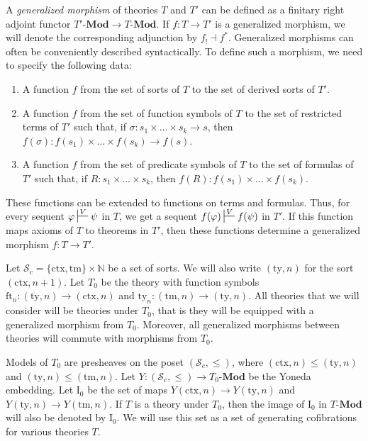 \documentclass[reqno]{amsart}
\theoremstyle{definition}
\theoremstyle{remark}
\newcommand{\fs}[1]{\mathrm{#1}}
\newcommand{\bcat}[1]{\mathbf{#1}}
\newcommand{\Mod}[1]{#1\text{-}\bcat{Mod}}
\newcommand{\I}{\fs{I}}
\numberwithin{figure}{section}
\begin{document}
A \emph{generalized morphism} of theories $T$ and $T'$ can be defined as a finitary right adjoint functor $\Mod{T'} \to \Mod{T}$.
If $f : T \to T'$ is a generalized morphism, we will denote the corresponding adjunction by $f_! \dashv f^*$.
Generalized morphisms can often be conveniently described syntactically.
To define such a morphism, we need to specify the following data:
\begin{enumerate}
\item A function $f$ from the set of sorts of $T$ to the set of derived sorts of $T'$.
\item A function $f$ from the set of function symbols of $T$ to the set of restricted terms of $T'$ such that, if $\sigma : s_1 \times \ldots \times s_k \to s$, then $f(\sigma) : f(s_1) \times \ldots \times f(s_k) \to f(s)$.
\item A function $f$ from the set of predicate symbols of $T$ to the set of formulas of $T'$ such that, if $R : s_1 \times \ldots \times s_k$, then $f(R) : f(s_1) \times \ldots \times f(s_k)$.
\end{enumerate}
These functions can be extended to functions on terms and formulas.
Thus, for every sequent $\varphi \sststile{}{V} \psi$ in $T$, we get a sequent $f(\varphi) \sststile{}{V} f(\psi)$ in $T'$.
If this function maps axioms of $T$ to theorems in $T'$, then these functions determine a generalized morphism $f : T \to T'$.

Let $\mathcal{S}_c = \{ \fs{ctx}, \fs{tm} \} \times \mathbb{N}$ be a set of sorts.
We will also write $(\fs{ty},n)$ for the sort $(\fs{ctx},n+1)$.
Let $T_0$ be the theory with function symbols $\fs{ft}_n : (\fs{ty},n) \to (\fs{ctx},n)$ and $\fs{ty}_n : (\fs{tm},n) \to (\fs{ty},n)$.
All theories that we will consider will be theories under $T_0$, that is they will be equipped with a generalized morphism from $T_0$.
Moreover, all generalized morphisms between theories will commute with morphisms from $T_0$.

Models of $T_0$ are presheaves on the poset $(\mathcal{S}_c,\leq)$, where $(\fs{ctx},n) \leq (\fs{ty},n)$ and $(\fs{ty},n) \leq (\fs{tm},n)$.
Let $Y : (\mathcal{S}_c,\leq) \to \Mod{T_0}$ be the Yoneda embedding.
Let $\I_0$ be the set of maps $Y(\fs{ctx},n) \to Y(\fs{ty},n)$ and $Y(\fs{ty},n) \to Y(\fs{tm},n)$.
If $T$ is a theory under $T_0$, then the image of $\I_0$ in $\Mod{T}$ will also be denoted by $\I_0$.
We will use this set as a set of generating cofibrations for various theories $T$.
\end{document}

